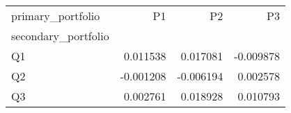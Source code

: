 \begin{tabular}{lrrr}
\toprule
primary_portfolio & P1 & P2 & P3 \\
secondary_portfolio &  &  &  \\
\midrule
Q1 & 0.011538 & 0.017081 & -0.009878 \\
Q2 & -0.001208 & -0.006194 & 0.002578 \\
Q3 & 0.002761 & 0.018928 & 0.010793 \\
\bottomrule
\end{tabular}
